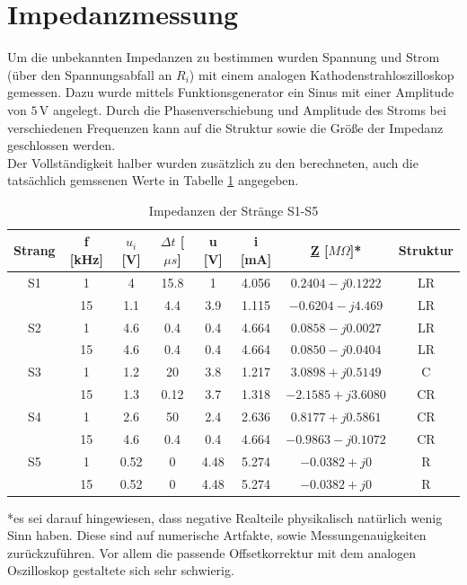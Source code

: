 \section{Impedanzmessung}
\label{sc:impedanzmessung}
Um die unbekannten Impedanzen zu bestimmen wurden Spannung und Strom (über den Spannungsabfall an $R_i$) mit einem analogen Kathodenstrahloszilloskop gemessen. Dazu wurde mittels Funktionsgenerator ein Sinus mit einer Amplitude von  $5\,$V angelegt. Durch die Phasenverschiebung und Amplitude des Stroms bei verschiedenen Frequenzen kann auf die Struktur sowie die Größe der Impedanz geschlossen werden. \\
Der Vollständigkeit halber wurden zusätzlich zu den berechneten, auch die tatsächlich gemssenen Werte in Tabelle \ref{tb:imp} angegeben. 
\begin{table}[H]
	\centering
	\begin{tabular}{|c|c||c|c||c|c|c|c|}
	\hline 
	Strang & f [kHz] & $u_i$ [V] & $\Delta t$ [$\mu s$] & u [V] & i [mA] & \underline{Z} [$M\Omega$]* & Struktur \\ 
	\hline 
	S1 & 1 & 4 & 15.8 & 1 & 4.056 & $0.2404 - j0.1222$ & LR \\ 
	\hline 
	 & 15 & 1.1 & 4.4 & 3.9 & 1.115 & $-0.6204 - j4.469$ & LR \\ 
	\hline 
	S2 & 1 & 4.6 & 0.4 & 0.4 & 4.664 & $0.0858 - j0.0027 $ & LR \\ 
	\hline 
	 & 15 & 4.6 & 0.4 & 0.4 & 4.664 & $0.0850 - j0.0404 $ & LR \\ 
	\hline 
	S3 & 1 & 1.2 & 20 & 3.8 & 1.217 & $3.0898 + j0.5149 $& C \\ 
	\hline 
	 & 15 & 1.3 & 0.12 & 3.7 & 1.318 & $-2.1585 + j3.6080 $ & CR \\ 
	\hline 
	S4 & 1 & 2.6 & 50 & 2.4 & 2.636 & $0.8177 + j0.5861 $ & CR \\ 
	\hline 
	 & 15 & 4.6 & 0.4 & 0.4 & 4.664 & $-0.9863 - j0.1072$ & CR \\ 
	\hline 
	S5 & 1 & 0.52 & 0 & 4.48 & 5.274 & $-0.0382 + j0$ & R \\ 
	\hline 
	 & 15 & 0.52 & 0 & 4.48 & 5.274  & $-0.0382 + j0$ & R \\ 
	\hline 
	\end{tabular} 
	\caption{Impedanzen der Stränge S1-S5}
	\label{tb:imp}
\end{table} *es sei darauf hingewiesen, dass negative Realteile physikalisch natürlich wenig Sinn haben. Diese sind auf numerische Artfakte, sowie Messungenauigkeiten zurückzuführen. Vor allem die passende Offsetkorrektur mit dem analogen Oszilloskop gestaltete sich sehr schwierig. \\ \\
